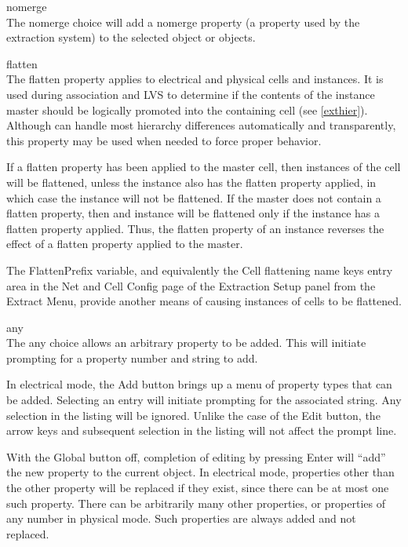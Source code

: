 \begin{description}
\item{\cb nomerge}\\
The {\cb nomerge} choice will add a {\et nomerge} property (a property
used by the extraction system) to the selected object or objects.

\item{\cb flatten}\\
The {\et flatten} property applies to electrical and physical cells
and instances.  It is used during association and LVS to determine if
the contents of the instance master should be logically promoted into
the containing cell (see \ref{exthier}).  Although {\Xic} can handle
most hierarchy differences automatically and transparently, this
property may be used when needed to force proper behavior.

If a {\et flatten} property has been applied to the master cell, then
instances of the cell will be flattened, unless the instance also has
the {\et flatten} property applied, in which case the instance will
not be flattened.  If the master does not contain a {\et flatten}
property, then and instance will be flattened only if the instance has
a {\et flatten} property applied.  Thus, the {\et flatten} property of
an instance reverses the effect of a {\et flatten} property applied to
the master.

The {\et FlattenPrefix} variable, and equivalently the {\cb Cell
flattening name keys} entry area in the {\cb Net and Cell Config} page
of the {\cb Extraction Setup} panel from the {\cb Extract Menu},
provide another means of causing instances of cells to be flattened.

\item{\cb any}\\
The {\cb any} choice allows an arbitrary property to be added.  This will
initiate prompting for a property number and string to add.
\end{description}

In electrical mode, the {\cb Add} button brings up a menu of property
types that can be added.  Selecting an entry will initiate prompting
for the associated string.  Any selection in the listing will be
ignored.  Unlike the case of the {\cb Edit} button, the arrow keys and
subsequent selection in the listing will not affect the prompt line.

With the {\cb Global} button off, completion of editing by pressing
{\kb Enter} will ``add'' the new property to the current object.  In
electrical mode, properties other than the {\et other} property will
be replaced if they exist, since there can be at most one such
property.  There can be arbitrarily many {\et other} properties, or
properties of any number in physical mode.  Such properties are always
added and not replaced.

